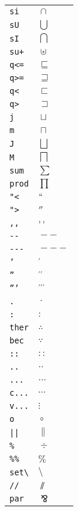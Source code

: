 \begin{longtable}{ll}
\texttt{si}&${}\cap {}$\\
\texttt{sU}&${}\bigcup {}$\\
\texttt{sI}&${}\bigcap {}$\\
\texttt{su+}&${}\uplus {}$\\
\texttt{q<=}&${}\sqsubseteq {}$\\
\texttt{q>=}&${}\sqsupseteq {}$\\
\texttt{q<}&${}\sqsubset {}$\\
\texttt{q>}&${}\sqsupset {}$\\
\texttt{j}&${}\sqcup {}$\\
\texttt{m}&${}\sqcap {}$\\
\texttt{J}&${}\bigsqcup {}$\\
\texttt{M}&${}\bigsqcap {}$\\
\texttt{sum}&${}\sum {}$\\
\texttt{prod}&${}\prod {}$\\
\texttt{"<}&${}``{}$\\
\texttt{">}&${}''{}$\\
\texttt{,,}&${},\!\!, {}$\\
\texttt{{-}{-}}&${}--{}$\\
\texttt{{-}{-}{-}}&${}---{}$\\
\texttt{'}&${}^{\prime} {}$\\
\texttt{''}&${}^{\prime\prime} {}$\\
\texttt{'''}&${}^{\prime\prime\prime} {}$\\
\texttt{.}&${}\cdotp {}$\\
\texttt{:}&${}: {}$\\
\texttt{ther}&${}\therefore {}$\\
\texttt{bec}&${}\because {}$\\
\texttt{::}&${}:: {}$\\
\texttt{..}&${}.. {}$\\
\texttt{...}&${}\ldots {}$\\
\texttt{c...}&${}\cdots {}$\\
\texttt{v...}&${}\vdots {}$\\
\texttt{o}&${}\circ {}$\\
\texttt{||}&${}\| {}$\\
\texttt{\%}&${}\div {}$\\
\texttt{\%\%}&${}\% {}$\\
\texttt{set\textbackslash }&${}\setminus {}$\\
\texttt{//}&${}\sslash {}$\\
\texttt{par}&${}\bindnasrepma {}$\\

\end{longtable}
